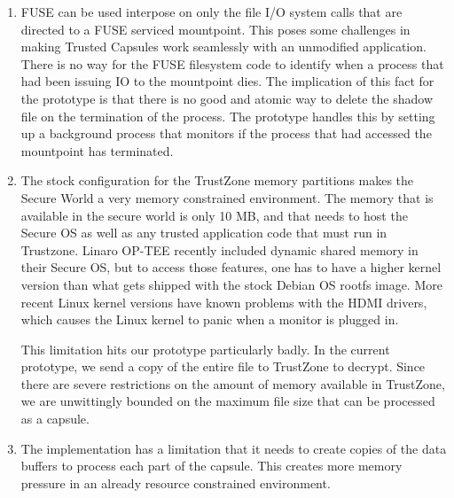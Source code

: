 \begin{enumerate}
    \item FUSE can be used interpose on only the file I/O system calls that are
directed to a FUSE serviced mountpoint. This poses some challenges in making
Trusted Capsules work seamlessly with an unmodified application.\\There is no
way for the FUSE filesystem code to identify when a process that had been
issuing IO to the mountpoint dies. The implication of this fact for the
prototype is that there is no good and atomic way to delete the shadow file on
the termination of the process. The prototype handles this by setting up a
background process that monitors if the process that had accessed the mountpoint
has terminated.
    \item The stock configuration for the TrustZone memory partitions makes the
Secure World a very memory constrained environment. The memory that is available
in the secure world is only 10 MB, and that needs to host the Secure OS as well
as any trusted application code that must run in Trustzone. Linaro OP-TEE
recently included dynamic shared memory in their Secure OS, but to access those
features, one has to have a higher kernel version than what gets shipped with
the stock Debian OS rootfs image. More recent Linux kernel versions have known
problems with the HDMI drivers, which causes the Linux kernel to panic when a
monitor is plugged in.

This limitation hits our prototype particularly badly. In the current prototype,
we send a copy of the entire file to TrustZone to decrypt. Since there are
severe restrictions on the amount of memory available in TrustZone, we are
unwittingly bounded on the maximum file size that can be processed as a capsule.
    \item The implementation has a limitation that it needs to create copies of
the data buffers to process each part of the capsule. This creates more memory
pressure in an already resource constrained environment. 

\end{enumerate}

